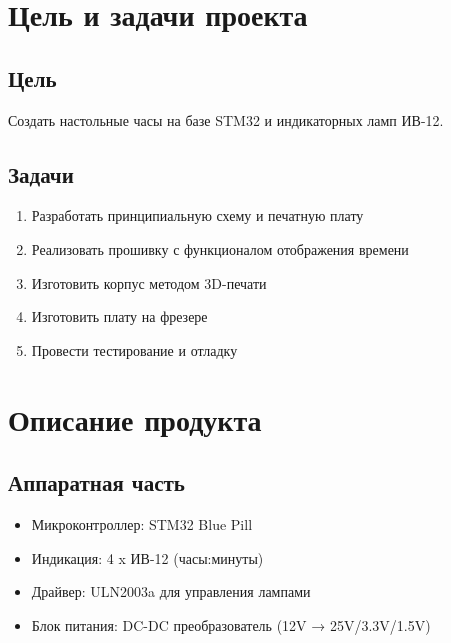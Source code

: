 \documentclass[a4paper,12pt]{article}
\begin{document}
\section{Цель и задачи проекта}
\subsection{Цель}
Создать настольные часы на базе STM32 и индикаторных ламп ИВ-12.

\subsection{Задачи}
\begin{enumerate}
    \item Разработать принципиальную схему и печатную плату
    \item Реализовать прошивку с функционалом отображения времени
    \item Изготовить корпус методом 3D-печати
    \item Изготовить плату на фрезере
    \item Провести тестирование и отладку
\end{enumerate}

\section{Описание продукта}
\subsection{Аппаратная часть}
\begin{itemize}
    \item Микроконтроллер: STM32 Blue Pill
    \item Индикация: 4 x ИВ-12 (часы:минуты)
    \item Драйвер: ULN2003a для управления лампами
    \item Блок питания: DC-DC преобразователь (12V → 25V/3.3V/1.5V)
\end{itemize}

\end{document}
